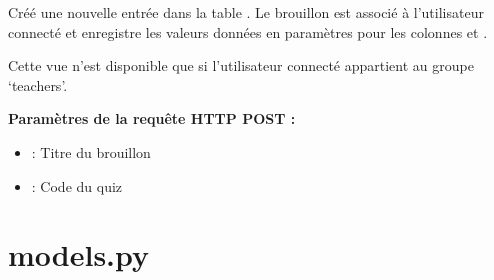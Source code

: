 \documentclass[a4,10pt,french]{sphinxmanual}
\begin{document}

\begin{fulllineitems}
\label{source:quiz.views.savedraft}
Créé une nouvelle entrée dans la table . Le brouillon est associé
à l'utilisateur connecté et enregistre les valeurs données en paramètres pour
les colonnes  et .

Cette vue n'est disponible que si l'utilisateur connecté appartient au groupe
`teachers'.

\textbf{Paramètres de la requête HTTP POST :}
\begin{itemize}
\item {} 
 : Titre du brouillon

\item {} 
 : Code du quiz

\end{itemize}

\end{fulllineitems}



\section{models.py}
\label{source:module-quiz.models}\label{source:models-py}
\end{document}
